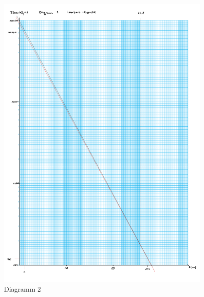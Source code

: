 \begin{figure}[h!]
    \centering
    \includegraphics[page=2, width=0.95\textwidth,]{Netzpapiere_BiotechII.pdf}
    \caption{Diagramm 2}
\end{figure}
\newpage

